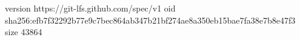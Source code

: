 version https://git-lfs.github.com/spec/v1
oid sha256:efb7f32292b77e9c7bec864ab347b21bf274ae8a350eb15bae7fa38e7b8e47f3
size 43864
